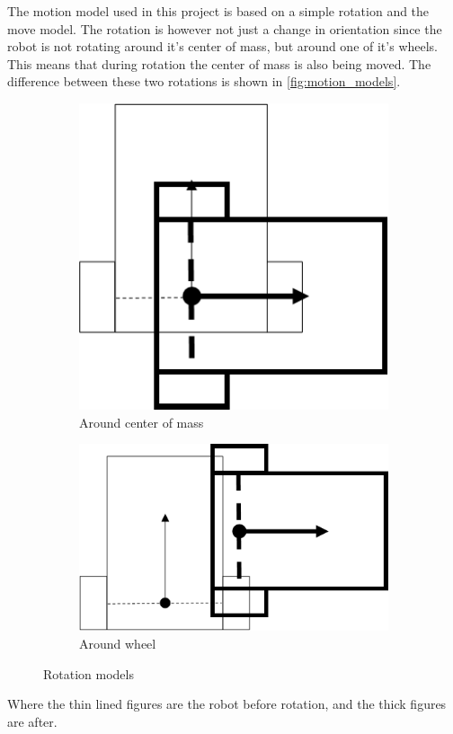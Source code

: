 \documentclass[Main]{subfiles}
\begin{document}
		The motion model used in this project is based on a simple rotation and the move model.
		The rotation is however not just a change in orientation since the robot is not rotating around it's center of mass, but around one of it's wheels.
		This means that during rotation the center of mass is also being moved.
		The difference between these two rotations is shown in \autoref{fig:motion_models}.
		\begin{figure}[H]
			\centering
			\begin{subfigure}[b]{0.45\linewidth}
				\includegraphics[scale=0.8]{./Figures/motion_model1.png}
				\caption{Around center of mass}
				\label{fig:motion_model1}
			\end{subfigure}	
			\begin{subfigure}[b]{0.45\linewidth}
				\includegraphics[scale=0.8]{./Figures/motion_model2.png}
				\caption{Around wheel}
				\label{fig:motion_model2}
			\end{subfigure}
		\caption{Rotation models}
		\label{fig:motion_models}
		\end{figure}
		Where the thin lined figures are the robot before rotation, and the thick figures are after.
\end{document}

